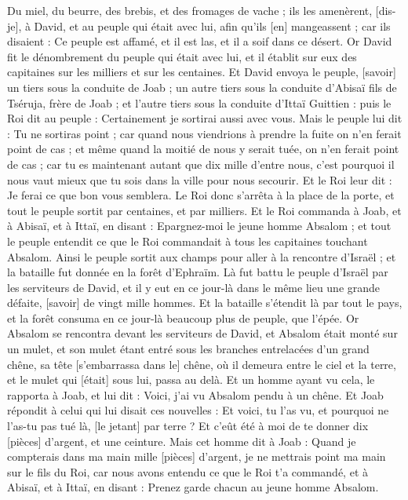 \begin{multicols}{2}
Du miel, du beurre, des brebis, et des fromages de vache ; ils les amenèrent, [dis-je], à David, et au peuple qui était avec lui, afin qu'ils [en] mangeassent ; car ils disaient : Ce peuple est affamé, et il est las, et il a soif dans ce désert.
\VerseOne{}Or David fit le dénombrement du peuple qui était avec lui, et il établit sur eux des capitaines sur les milliers et sur les centaines.
Et David envoya le peuple, [savoir] un tiers sous la conduite de Joab ; un autre tiers sous la conduite d'Abisaï fils de Tséruja, frère de Joab ; et l'autre tiers sous la conduite d'Ittaï Guittien : puis le Roi dit au peuple : Certainement je sortirai aussi avec vous.
Mais le peuple lui dit : Tu ne sortiras point ; car quand nous viendrions à prendre la fuite on n'en ferait point de cas ; et même quand la moitié de nous y serait tuée, on n'en ferait point de cas ; car tu es maintenant autant que dix mille d'entre nous, c'est pourquoi il nous vaut mieux que tu sois dans la ville pour nous secourir.
Et le Roi leur dit : Je ferai ce que bon vous semblera. Le Roi donc s'arrêta à la place de la porte, et tout le peuple sortit par centaines, et par milliers.
Et le Roi commanda à Joab, et à Abisaï, et à Ittaï, en disant : Epargnez-moi le jeune homme Absalom ; et tout le peuple entendit ce que le Roi commandait à tous les capitaines touchant Absalom.
Ainsi le peuple sortit aux champs pour aller à la rencontre d'Israël ; et la bataille fut donnée en la forêt d'Ephraïm.
Là fut battu le peuple d'Israël par les serviteurs de David, et il y eut en ce jour-là dans le même lieu une grande défaite, [savoir] de vingt mille hommes.
Et la bataille s'étendit là par tout le pays, et la forêt consuma en ce jour-là beaucoup plus de peuple, que l'épée.
Or Absalom se rencontra devant les serviteurs de David, et Absalom était monté sur un mulet, et son mulet étant entré sous les branches entrelacées d'un grand chêne, sa tête [s'embarrassa dans le] chêne, où il demeura entre le ciel et la terre, et le mulet qui [était] sous lui, passa au delà.
Et un homme ayant vu cela, le rapporta à Joab, et lui dit : Voici, j'ai vu Absalom pendu à un chêne.
Et Joab répondit à celui qui lui disait ces nouvelles : Et voici, tu l'as vu, et pourquoi ne l'as-tu pas tué là, [le jetant] par terre ? Et c'eût été à moi de te donner dix [pièces] d'argent, et une ceinture.
Mais cet homme dit à Joab : Quand je compterais dans ma main mille [pièces] d'argent, je ne mettrais point ma main sur le fils du Roi, car nous avons entendu ce que le Roi t'a commandé, et à Abisaï, et à Ittaï, en disant : Prenez garde chacun au jeune homme Absalom.

\end{multicols}
